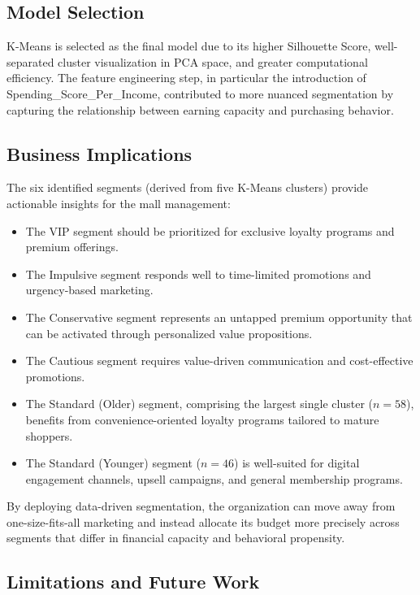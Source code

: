 \documentclass[12pt,a4paper]{article}
\begin{document}
\subsection{Model Selection}

K-Means is selected as the final model due to its higher Silhouette Score, well-separated cluster visualization in PCA space, and greater computational efficiency. The feature engineering step, in particular the introduction of Spending\_Score\_Per\_Income, contributed to more nuanced segmentation by capturing the relationship between earning capacity and purchasing behavior.

\subsection{Business Implications}

The six identified segments (derived from five K-Means clusters) provide actionable insights for the mall management:

\begin{itemize}
    \item The VIP segment should be prioritized for exclusive loyalty programs and premium offerings.
    \item The Impulsive segment responds well to time-limited promotions and urgency-based marketing.
    \item The Conservative segment represents an untapped premium opportunity that can be activated through personalized value propositions.
    \item The Cautious segment requires value-driven communication and cost-effective promotions.
    \item The Standard (Older) segment, comprising the largest single cluster ($n = 58$), benefits from convenience-oriented loyalty programs tailored to mature shoppers.
    \item The Standard (Younger) segment ($n = 46$) is well-suited for digital engagement channels, upsell campaigns, and general membership programs.
\end{itemize}

By deploying data-driven segmentation, the organization can move away from one-size-fits-all marketing and instead allocate its budget more precisely across segments that differ in financial capacity and behavioral propensity.

\subsection{Limitations and Future Work}
\end{document}
